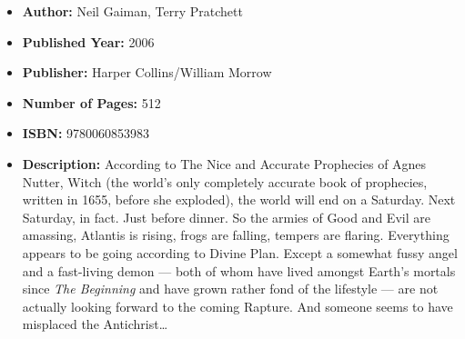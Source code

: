 \documentclass{tufte-handout}
\begin{document}
\begin{itemize}
    \item[] \textbf{Author:} Neil Gaiman, Terry Pratchett
    \item[] \textbf{Published Year:} 2006
    \item[] \textbf{Publisher:} Harper Collins/William Morrow
    \item[] \textbf{Number of Pages:} 512      
    \item[] \textbf{ISBN:} 9780060853983
    \item[] \textbf{Description:} According to The Nice and Accurate Prophecies of Agnes Nutter, Witch (the world's only completely accurate book of prophecies, written in 1655, before she exploded), the world will end on a Saturday. Next Saturday, in fact. Just before dinner. So the armies of Good and Evil are amassing, Atlantis is rising, frogs are falling, tempers are flaring. Everything appears to be going according to Divine Plan. Except a somewhat fussy angel and a fast-living demon --- both of whom have lived amongst Earth's mortals since \emph{The Beginning} and have grown rather fond of the lifestyle --- are not actually looking forward to the coming Rapture. And someone seems to have misplaced the Antichrist\ldots \end{itemize}
\end{document}
